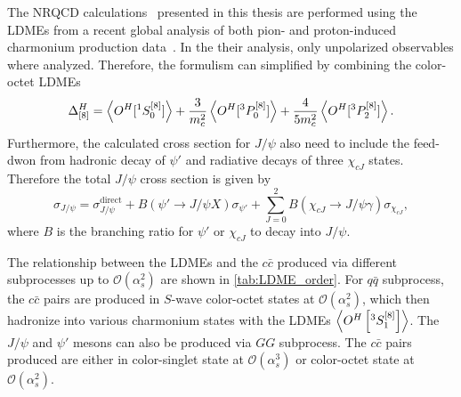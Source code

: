 \documentclass[../main.tex]{subfiles}
\begin{document}
The NRQCD calculations~\cite{chang2023a} presented in this thesis are performed using the LDMEs
from a recent global analysis of both pion- and proton-induced charmonium production data~\cite{chang2023}.
In the their analysis, only unpolarized observables where analyzed.
Therefore, the formulism can simplified by combining the color-octet LDMEs
\begin{equation}
	\Delta^H_{[8]}=\expval{O^H[^1S_0^{\left[8\right]}]}+\frac{3}{m_c^2}\expval{O^H[^3P_0^{\left[8\right]}]}+\frac{4}{5m_c^2}\expval{O^H[^3P_2^{\left[8\right]}]}.
\end{equation}
Furthermore, the calculated cross section for $J/\psi$ also need to include the feed-dwon from hadronic decay
of $\psi'$ and radiative decays of three $\chi_{cJ}$ states.
Therefore the total $J/\psi$ cross section is given by
\begin{equation}
	\sigma_{J/\psi}=\sigma_{J/\psi}^{\mathrm{direct}}+B\left(\psi'\to J/\psi X\right)\sigma_{\psi'} +\sum_{J=0}^2 B\left(\chi_{cJ}\to J/\psi\gamma\right) \sigma_{\chi_{cJ}},
\end{equation}
where $B$ is the branching ratio for $\psi'$ or $\chi_{cJ}$ to decay into $J/\psi$.

The relationship between the LDMEs and the $c\bar{c}$ produced via different
subprocesses up to $\mathcal{O}\left(\alpha_s^2\right)$ are shown in \cref{tab:LDME_order}.
For $q\bar{q}$ subprocess, the $c\bar{c}$ pairs are produced in
$S$-wave color-octet states at $\mathcal{O}\left(\alpha_s^2\right)$,
which then hadronize into various charmonium states with the LDMEs $\expval{O^H\left[^3 S_1^{[8]}\right]}$.
The $J/\psi$ and $\psi'$ mesons can also be produced via $GG$ subprocess.
The $c\bar{c}$ pairs produced are either in color-singlet
state at $\mathcal{O}\left(\alpha_s^3\right)$ or color-octet state at $\mathcal{O}\left(\alpha_s^2\right)$.
\end{document}
